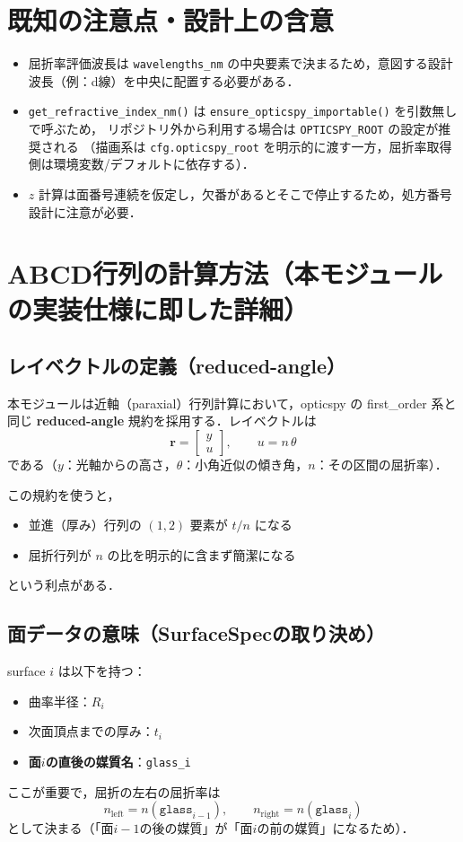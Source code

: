 \documentclass[a4paper,11pt]{jsarticle} %
\begin{document}
\section{既知の注意点・設計上の含意}
\begin{itemize}
  \item 屈折率評価波長は \texttt{wavelengths\_nm} の中央要素で決まるため，意図する設計波長（例：d線）を中央に配置する必要がある．
  \item \texttt{get\_refractive\_index\_nm()} は \texttt{ensure\_opticspy\_importable()} を引数無しで呼ぶため，
        リポジトリ外から利用する場合は \texttt{OPTICSPY\_ROOT} の設定が推奨される
        （描画系は \texttt{cfg.opticspy\_root} を明示的に渡す一方，屈折率取得側は環境変数/デフォルトに依存する）．
  \item $z$ 計算は面番号連続を仮定し，欠番があるとそこで停止するため，処方番号設計に注意が必要．
\end{itemize}


\section{ABCD行列の計算方法（本モジュールの実装仕様に即した詳細）}

\subsection{レイベクトルの定義（reduced-angle）}
本モジュールは近軸（paraxial）行列計算において，opticspy の first\_order 系と同じ
\textbf{reduced-angle} 規約を採用する．レイベクトルは
\[
\mathbf{r}=
\begin{bmatrix}
y\\
u
\end{bmatrix},
\qquad
u = n\,\theta
\]
である（$y$：光軸からの高さ，$\theta$：小角近似の傾き角，$n$：その区間の屈折率）．

この規約を使うと，
\begin{itemize}
  \item 並進（厚み）行列の $(1,2)$ 要素が $t/n$ になる
  \item 屈折行列が $n$ の比を明示的に含まず簡潔になる
\end{itemize}
という利点がある．

\subsection{面データの意味（SurfaceSpecの取り決め）}
surface $i$ は以下を持つ：
\begin{itemize}
  \item 曲率半径：$R_i$
  \item 次面頂点までの厚み：$t_i$
  \item \textbf{面$i$の直後の媒質名}：\texttt{glass\_i}
\end{itemize}
ここが重要で，屈折の左右の屈折率は
\[
n_{\text{left}} = n(\texttt{glass}_{i-1}),\qquad
n_{\text{right}} = n(\texttt{glass}_{i})
\]
として決まる（「面$i-1$の後の媒質」が「面$i$の前の媒質」になるため）．
\end{document}
